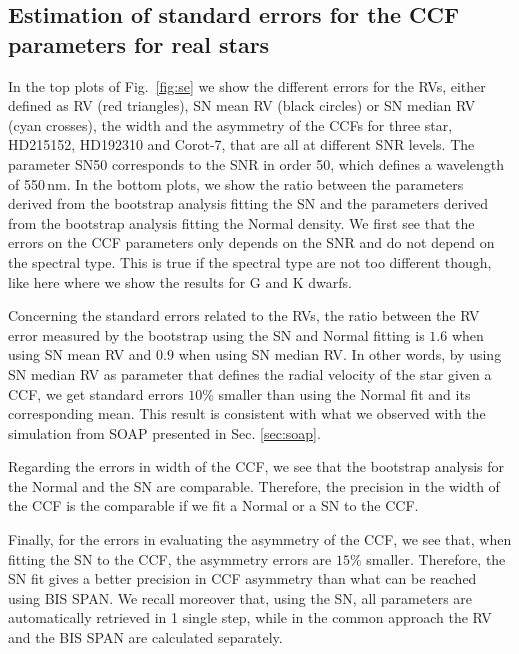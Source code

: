 \documentclass{aa}
\begin{document}
\subsection{Estimation of standard errors for the CCF parameters for real stars} \label{sec:bootstrap_real_star}
In the top plots of Fig.~\ref{fig:se} we show the different errors for the RVs, either defined as RV (red triangles), SN mean RV (black circles) or SN median RV (cyan crosses), the width and the asymmetry of the CCFs for three star, HD215152, HD192310 and Corot-7, that are all at different SNR levels. The parameter SN50 corresponds to the SNR in order 50, which defines a wavelength of 550\,nm. In the bottom plots, we show the ratio between the parameters derived from the bootstrap analysis fitting the SN and the parameters derived from the bootstrap analysis fitting the Normal density. We first see that the errors on the CCF parameters only depends on the SNR and do not depend on the spectral type. This is true if the spectral type are not too different though, like here where we show the results for G and K dwarfs.

Concerning the standard errors related to the RVs, the ratio between the RV error measured by the bootstrap using the SN and Normal fitting is $1.6$ when using SN mean RV and $0.9$ when using SN median RV. In other words, by using SN median RV as parameter that defines the radial velocity of the star given a CCF, we get standard errors $10\%$ smaller than using the Normal fit and its corresponding mean. This result is consistent with what we observed with the simulation from SOAP presented in Sec. \ref{sec:soap}.

Regarding the errors in width of the CCF, we see that the bootstrap analysis for the Normal and the SN are comparable. Therefore, the precision in the width of the CCF is the comparable if we fit a Normal or a SN to the CCF.

Finally, for the errors in evaluating the asymmetry of the CCF, we see that, when fitting the SN to the CCF, the asymmetry errors are $15\%$ smaller. Therefore, the SN fit gives a better precision in CCF asymmetry than what can be reached using BIS SPAN. We recall moreover that, using the SN, all parameters are automatically retrieved in 1 single step, while in the common approach the RV and the BIS SPAN are calculated separately.
\end{document}

